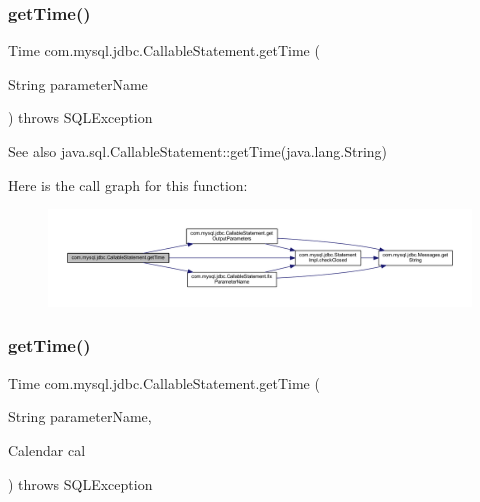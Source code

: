 \subsubsection{\texorpdfstring{get\+Time()}{getTime()}\hspace{0.1cm}{\footnotesize\ttfamily [3/4]}}
{\footnotesize\ttfamily Time com.\+mysql.\+jdbc.\+Callable\+Statement.\+get\+Time (\begin{DoxyParamCaption}\item[{String}]{parameter\+Name }\end{DoxyParamCaption}) throws S\+Q\+L\+Exception}

\begin{DoxySeeAlso}{See also}
java.\+sql.\+Callable\+Statement\+::get\+Time(java.\+lang.\+String) 
\end{DoxySeeAlso}
Here is the call graph for this function\+:\nopagebreak
\begin{figure}[H]
\begin{center}
\leavevmode
\includegraphics[width=350pt]{classcom_1_1mysql_1_1jdbc_1_1_callable_statement_a12256fce41eba515d055b3b2a9d75d0f_cgraph}
\end{center}
\end{figure}
\mbox{\label{classcom_1_1mysql_1_1jdbc_1_1_callable_statement_af552f75778c2ff1df5e7ef47014e5810}} 
\subsubsection{\texorpdfstring{get\+Time()}{getTime()}\hspace{0.1cm}{\footnotesize\ttfamily [4/4]}}
{\footnotesize\ttfamily Time com.\+mysql.\+jdbc.\+Callable\+Statement.\+get\+Time (\begin{DoxyParamCaption}\item[{String}]{parameter\+Name,  }\item[{Calendar}]{cal }\end{DoxyParamCaption}) throws S\+Q\+L\+Exception}

